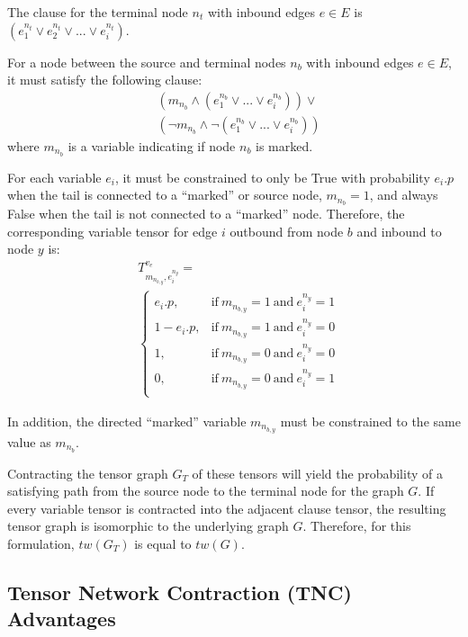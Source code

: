 \documentclass[12pt,twocolumn]{article}
\begin{document}
The clause for the terminal node \(n_t\) with inbound edges \(e \in E\) is \((e_1^{n_t} \lor e_2^{n_t} \lor ... \lor e_i^{n_t})\).

For a node between the source and terminal nodes \(n_b\) with inbound edges \(e \in E\), it must satisfy the following clause: \begin{equation*}
\begin{split}
& (m_{n_b} \land (e_1^{n_b} \lor ... \lor e_i^{n_b})) \lor \\
& (\neg m_{n_b} \land \neg (e_1^{n_b} \lor ... \lor e_i^{n_b}))
\end{split}
\end{equation*} where \(m_{n_b}\) is a variable indicating if node \(n_b\) is marked.

For each variable \(e_i\), it must be constrained to only be True with probability \(e_i.p\) when the tail is connected to a ``marked'' or source node, \(m_{n_b}=1\), and always False when the tail is not connected to a ``marked'' node. Therefore, the corresponding variable tensor for edge \(i\) outbound from node \(b\) and inbound to node \(y\) is: \begin{equation*}
\begin{split}
& T^{v_e}_{m_{n_{b,y}},e_i^{n_y}}= \\
& \begin{cases}
  e_i.p, & \text{if}\ m_{n_{b,y}}=1\ \text{and}\ e_i^{n_y}=1 \\
  1-e_i.p, & \text{if}\ m_{n_{b,y}}=1\ \text{and}\ e_i^{n_y}=0 \\
  1, & \text{if}\ m_{n_{b,y}}=0\ \text{and}\ e_i^{n_y}=0 \\
  0, & \text{if}\ m_{n_{b,y}}=0\ \text{and}\ e_i^{n_y}=1 \\
\end{cases}
\end{split}
\end{equation*}

In addition, the directed ``marked'' variable \(m_{n_{b,y}}\) must be constrained to the same value as \(m_{n_b}\).

Contracting the tensor graph \(G_T\) of these tensors will yield the probability of a satisfying path from the source node to the terminal node for the graph \(G\). If every variable tensor is contracted into the adjacent clause tensor, the resulting tensor graph is isomorphic to the underlying graph \(G\). Therefore, for this formulation, \(tw(G_T)\) is equal to \(tw(G)\).

\hypertarget{tensor-network-contraction-tnc-advantages}{%
\subsection{Tensor Network Contraction (TNC) Advantages}\label{tensor-network-contraction-tnc-advantages}}
\end{document}
